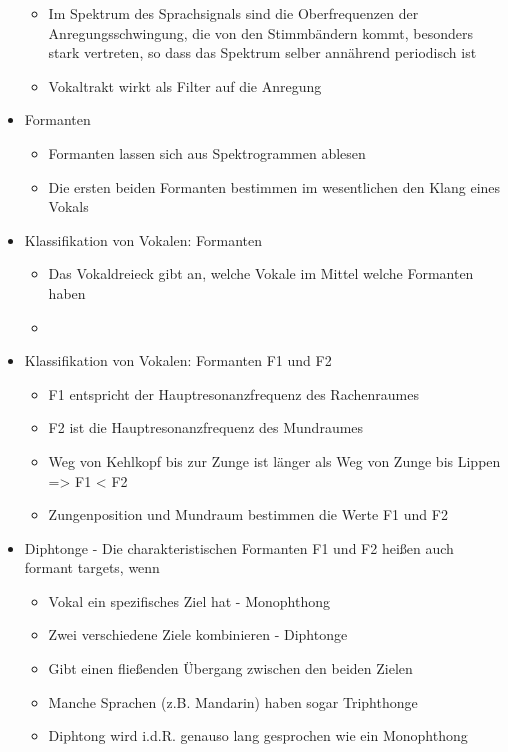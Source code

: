 \documentclass[a4paper,10pt,oneside]{article}
\begin{document}
\begin{itemize}
			\begin{itemize}
				\item Im Spektrum des Sprachsignals sind die Oberfrequenzen der Anregungsschwingung, die von den Stimmbändern kommt, besonders stark vertreten, so dass das Spektrum selber annährend periodisch ist
				\item Vokaltrakt wirkt als Filter auf die Anregung
			\end{itemize}
		\item Formanten
			\begin{itemize}
				\item Formanten lassen sich aus Spektrogrammen ablesen
				\item Die ersten beiden Formanten bestimmen im wesentlichen den Klang eines Vokals
			\end{itemize}
		\item Klassifikation von Vokalen: Formanten
			\begin{itemize}
				\item Das Vokaldreieck gibt an, welche Vokale im Mittel welche Formanten haben
				\item[] %
			\end{itemize}
		\item Klassifikation von Vokalen: Formanten F1 und F2
			\begin{itemize}
				\item F1 entspricht der Hauptresonanzfrequenz des Rachenraumes
				\item F2 ist die Hauptresonanzfrequenz des Mundraumes
				\item Weg von Kehlkopf bis zur Zunge ist länger als Weg von Zunge bis Lippen => F1 < F2
				\item Zungenposition und Mundraum bestimmen die Werte F1 und F2
			\end{itemize}
		\item Diphtonge - Die charakteristischen Formanten F1 und F2 heißen auch formant targets, wenn
			\begin{itemize}
				\item Vokal ein spezifisches Ziel hat - Monophthong
				\item Zwei verschiedene Ziele kombinieren - Diphtonge
				\item Gibt einen fließenden Übergang zwischen den beiden Zielen
				\item Manche Sprachen (z.B. Mandarin) haben sogar Triphthonge 
				\item Diphtong wird i.d.R. genauso lang gesprochen wie ein Monophthong

\end{itemize}
\end{itemize}
\end{document}
